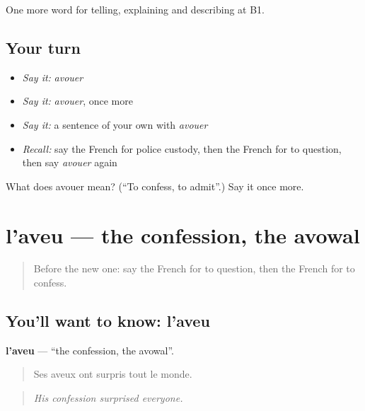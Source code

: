 \begin{grammarlens}[title={What you've built}]
One more word for telling, explaining and describing at B1.
\end{grammarlens}

\subsection*{Your turn}
\begin{itemize}
\raggedright
  \item \emph{Say it:} \emph{avouer}
  \item \emph{Say it:} \emph{avouer}, once more
  \item \emph{Say it:} a sentence of your own with \emph{avouer}
  \item \emph{Recall:} say the French for police custody, then the French for to question, then say \emph{avouer} again
\end{itemize}

\begin{tcolorbox}[breakable,colback=teal!4,colframe=teal!35!black,title={Before you move on}]
What does avouer mean? (\textquotedblleft{}To confess, to admit\textquotedblright{}.) Say it once more.
\end{tcolorbox}
\section[l'aveu]{l'aveu — the confession, the avowal}

\label{lesson:FR-C295-aveu}



\begin{quote}
Before the new one: say the French for to question, then the French for to confess.
\end{quote}

\subsection*{You'll want to know: l'aveu}
\textbf{l'aveu} — \textquotedblleft{}the confession, the avowal\textquotedblright{}.

\begin{quote}
Ses aveux ont surpris tout le monde.
\end{quote}

\begin{quote}
\emph{His confession surprised everyone.}
\end{quote}


